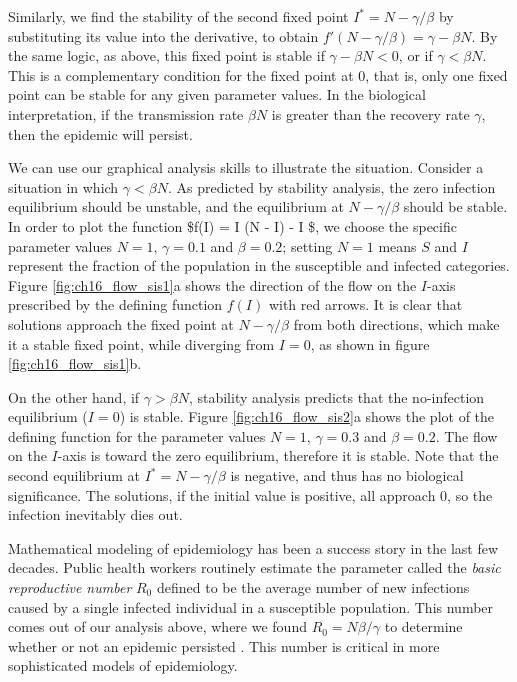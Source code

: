 \documentclass[
  letterpaper,
  DIV=11,
  numbers=noendperiod]{scrreprt}
\begin{document}
Similarly, we find the stability of the second fixed point
\(I^* = N - \gamma/\beta\) by substituting its value into the
derivative, to obtain \(f'(N - \gamma/\beta) = \gamma - \beta N\). By
the same logic, as above, this fixed point is stable if
\(\gamma - \beta N < 0\), or if \(\gamma < \beta N\). This is a
complementary condition for the fixed point at 0, that is, only one
fixed point can be stable for any given parameter values. In the
biological interpretation, if the transmission rate \(\beta N\) is
greater than the recovery rate \(\gamma\), then the epidemic will
persist.

We can use our graphical analysis skills to illustrate the situation.
Consider a situation in which \(\gamma < \beta N\). As predicted by
stability analysis, the zero infection equilibrium should be unstable,
and the equilibrium at \(N - \gamma/\beta\) should be stable. In order
to plot the function \$f(I) = \beta I (N - I) - \gamma I \$, we choose
the specific parameter values \(N=1\), \(\gamma = 0.1\) and
\(\beta = 0.2\); setting \(N=1\) means \(S\) and \(I\) represent the
fraction of the population in the susceptible and infected categories.
Figure \ref{fig:ch16_flow_sis1}a shows the direction of the flow on the
\(I\)-axis prescribed by the defining function \(f(I)\) with red arrows.
It is clear that solutions approach the fixed point at
\(N - \gamma/\beta\) from both directions, which make it a stable fixed
point, while diverging from \(I=0\), as shown in figure
\ref{fig:ch16_flow_sis1}b.

On the other hand, if \(\gamma > \beta N\), stability analysis predicts
that the no-infection equilibrium (\(I=0\)) is stable. Figure
\ref{fig:ch16_flow_sis2}a shows the plot of the defining function for
the parameter values \(N=1\), \(\gamma = 0.3\) and \(\beta = 0.2\). The
flow on the \(I\)-axis is toward the zero equilibrium, therefore it is
stable. Note that the second equilibrium at \(I^* = N - \gamma/\beta\)
is negative, and thus has no biological significance. The solutions, if
the initial value is positive, all approach 0, so the infection
inevitably dies out.

Mathematical modeling of epidemiology has been a success story in the
last few decades. Public health workers routinely estimate the
parameter called the
 \emph{basic reproductive
number} \(R_0\) defined to be the average number of new infections
caused by a single infected individual in a susceptible population. This
number comes out of our analysis above, where we found
\(R_0 = N \beta/\gamma\) to determine whether or not an epidemic
persisted \cite{brauer_mathematical_2011}. This number is critical in
more sophisticated models of epidemiology.
\end{document}
